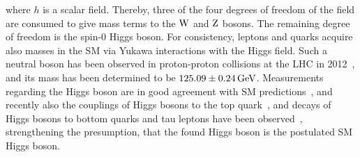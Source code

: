 where $h$ is a scalar field. Thereby, three of the four degrees of freedom of the field are consumed to give mass terms to the $\mathrm{W}$ and $\mathrm{Z}$ bosons. The remaining degree of freedom is the spin-0 Higgs boson. For consistency, leptons and quarks acquire also masses in the SM via Yukawa interactions with the Higgs field.
Such a neutral boson has been observed in proton-proton collisions at the LHC in 2012~\cite{HiggsCMS,HiggsATLAS}, and its mass has been determined to be $125.09\pm0.24\,\text{Ge\hspace{-.08em}V}$. Measurements regarding the Higgs boson are in good agreement with SM predictions~\cite{HiggsPrecise}, and recently also the couplings of Higgs bosons to the top quark~\cite{ttH}, and decays of Higgs bosons to bottom quarks and tau leptons have been observed~\cite{HiggsTauTau,HiggsBB}, strengthening the presumption, that the found Higgs boson is the postulated SM Higgs boson.



